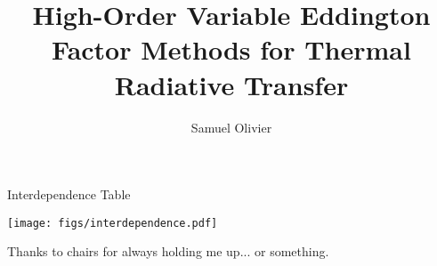 \documentclass[todo]{dissertation}
\begin{document}
\title{High-Order Variable Eddington Factor Methods for Thermal Radiative Transfer}
\author{Samuel Olivier}
\maketitle

\copyrightpage

\begin{abstract}

\end{abstract}

\begin{frontmatter}

\begin{KeepFromToc}
\tableofcontents
\end{KeepFromToc}
\clearpage

\begin{preamble}{Interdependence Table}
\vfill
\begin{center}
\texttt{[image: figs/interdependence.pdf]}
\end{center}
\end{preamble}

\printglossary[style=april_gloss_style]
\clearpage


\begin{preamble}{\acknowledgename}
Thanks to chairs for always holding me up... or something. 
\end{preamble}
\end{frontmatter}

\pagestyle{headings}











\appendix 


\clearpage
\printbibliography
\end{document}

